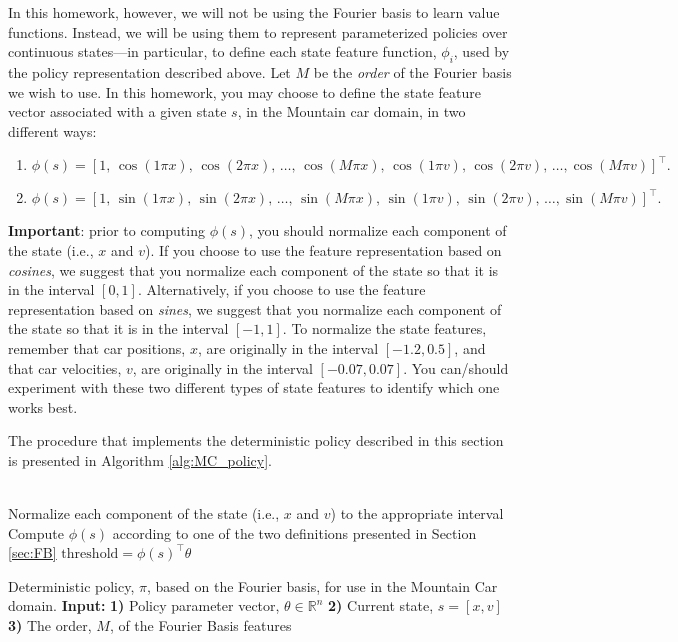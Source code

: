 \documentclass{article}
\begin{document}
\vspace{0.2in}

In this homework, however, we will not be using the Fourier basis to learn value functions. Instead, we will be using them to represent parameterized policies over continuous states---in particular, to define each state feature function, $\phi_i$, used by the policy representation described above. Let $M$ be the \textit{order} of the Fourier basis we wish to use. In this homework, you may choose to define the state feature vector associated with a given state $s$, in the Mountain car domain, in two different ways:

\begin{enumerate}
    \item $\phi(s) = [1,\, \cos(1 \pi x),\, \cos(2 \pi x),\, \ldots,\, \cos(M \pi x),\, \cos(1 \pi v),\, \cos(2 \pi v),\, \ldots, \cos(M \pi v)]^\top.$
\item $\phi(s) = [1,\, \sin(1 \pi x),\, \sin(2 \pi x),\, \ldots,\, \sin(M \pi x),\, \sin(1 \pi v),\, \sin(2 \pi v),\, \ldots, \sin(M \pi v)]^\top.$
\end{enumerate}

\textbf{Important}: prior to computing $\phi(s)$, you should normalize each component of the state (i.e., $x$ and $v$). If you choose to use the feature representation based on \textit{cosines}, we suggest that you normalize each component of the state so that it is in the interval $[0, 1]$. Alternatively, if you choose to use the feature representation based on \textit{sines}, we suggest that you normalize each component of the state so that it is in the interval $[-1, 1]$. To normalize the state features, remember that car positions, $x$, are originally in the interval $[-1.2, 0.5]$, and that car velocities, $v$, are originally in the interval $[-0.07, 0.07]$. You can/should experiment with these two different types of state features to identify which one works best.

\vspace{0.3in}

The procedure that implements the deterministic policy described in this section is presented in Algorithm \ref{alg:MC_policy}.
\\ \\
\begin{algorithm}[H]
    Normalize each component of the state (i.e., $x$ and $v$) to the appropriate interval\;
    Compute $\phi(s)$ according to one of the two definitions presented in Section \ref{sec:FB}\;
    $\mathrm{threshold} = \phi(s)^\top \theta$\;
    
\caption{Deterministic policy, $\pi$, based on the Fourier basis, for use in the Mountain Car domain.\newline
\textbf{Input:}
\newline \textbf{1)} Policy parameter vector, $\theta \in \mathbb R^n$
\newline \textbf{2)} Current state, $s=[x,v]$
\newline \textbf{3)} The order, $M$, of the Fourier Basis features}
\label{alg:MC_policy}
\end{algorithm}
\end{document}
